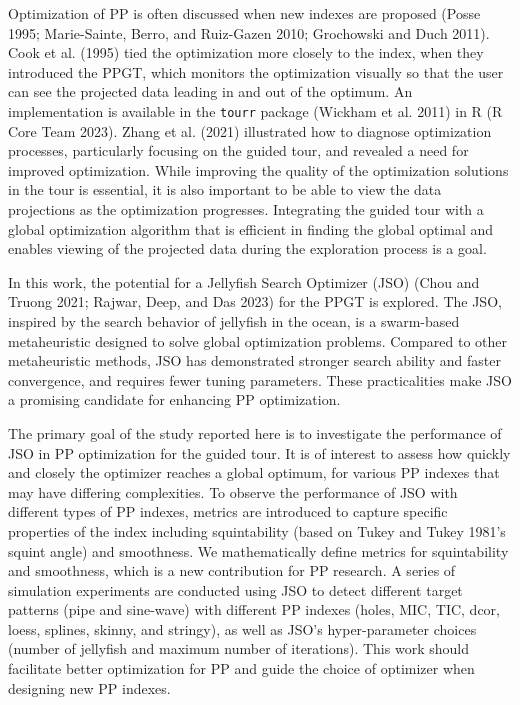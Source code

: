 \documentclass[
  12pt,
]{interact}
\theoremstyle{plain}
\begin{document}
Optimization of PP is often discussed when new indexes are proposed
(Posse 1995; Marie-Sainte, Berro, and Ruiz-Gazen 2010; Grochowski and
Duch 2011). Cook et al. (1995) tied the optimization more closely to the
index, when they introduced the PPGT, which monitors the optimization
visually so that the user can see the projected data leading in and out
of the optimum. An implementation is available in the \texttt{tourr}
package (Wickham et al. 2011) in R (R Core Team 2023). Zhang et al.
(2021) illustrated how to diagnose optimization processes, particularly
focusing on the guided tour, and revealed a need for improved
optimization. While improving the quality of the optimization solutions
in the tour is essential, it is also important to be able to view the
data projections as the optimization progresses. Integrating the guided
tour with a global optimization algorithm that is efficient in finding
the global optimal and enables viewing of the projected data during the
exploration process is a goal.

In this work, the potential for a Jellyfish Search Optimizer (JSO) (Chou
and Truong 2021; Rajwar, Deep, and Das 2023) for the PPGT is explored.
The JSO, inspired by the search behavior of jellyfish in the ocean, is a
swarm-based metaheuristic designed to solve global optimization
problems. Compared to other metaheuristic methods, JSO has demonstrated
stronger search ability and faster convergence, and requires fewer
tuning parameters. These practicalities make JSO a promising candidate
for enhancing PP optimization.

The primary goal of the study reported here is to investigate the
performance of JSO in PP optimization for the guided tour. It is of
interest to assess how quickly and closely the optimizer reaches a
global optimum, for various PP indexes that may have differing
complexities. To observe the performance of JSO with different types of
PP indexes, metrics are introduced to capture specific properties of the
index including squintability (based on Tukey and Tukey 1981's squint
angle) and smoothness. We mathematically define metrics for
squintability and smoothness, which is a new contribution for PP
research. A series of simulation experiments are conducted using JSO to
detect different target patterns (pipe and sine-wave) with different PP
indexes (holes, MIC, TIC, dcor, loess, splines, skinny, and stringy), as
well as JSO's hyper-parameter choices (number of jellyfish and maximum
number of iterations). This work should facilitate better optimization
for PP and guide the choice of optimizer when designing new PP indexes.
\end{document}
